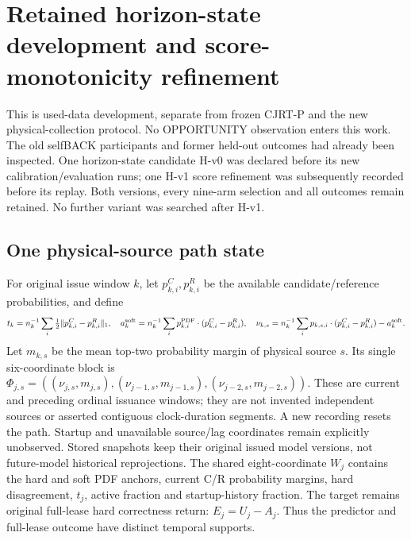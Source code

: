 \section{Retained horizon-state development and score-monotonicity refinement}
\label{app:horizon-development}
This is used-data development, separate from frozen CJRT-P and the new
physical-collection protocol. No OPPORTUNITY observation enters this work.
The old selfBACK participants and former held-out outcomes had already been
inspected. One horizon-state candidate H-v0 was declared before its new
calibration/evaluation runs; one H-v1 score refinement was subsequently
recorded before its replay. Both versions, every nine-arm selection and all
outcomes remain retained. No further variant was searched after H-v1.

\subsection{One physical-source path state}
For original issue window $k$, let $p^C_{k,i},p^R_{k,i}$ be the available
candidate/reference probabilities, and define
\begin{equation}
 t_k=n_k^{-1}\sum_i\tfrac12\|p^C_{k,i}-p^R_{k,i}\|_1,\quad
 a_k^{\rm soft}=n_k^{-1}\sum_i p^{\rm PDF}_{k,i}\cdot(p^C_{k,i}-p^R_{k,i}),\quad
 \nu_{k,s}=n_k^{-1}\sum_i p_{k,s,i}\cdot(p^C_{k,i}-p^R_{k,i})-a_k^{\rm soft}.
 \label{eq:h-development-soft-evidence}
\end{equation}
Let $m_{k,s}$ be the mean top-two probability margin of physical source $s$.
Its single six-coordinate block is
$\Phi_{j,s}=((\nu_{j,s},m_{j,s}),
(\nu_{j-1,s},m_{j-1,s}),(\nu_{j-2,s},m_{j-2,s}))$.
These are current and preceding ordinal issuance windows; they are not
invented independent sources or asserted contiguous clock-duration segments.
A new recording resets the path. Startup and unavailable source/lag
coordinates remain explicitly unobserved. Stored snapshots keep their
original issued model versions, not future-model historical reprojections.
The shared eight-coordinate $W_j$ contains the hard and soft PDF anchors,
current C/R probability margins, hard disagreement, $t_j$, active fraction
and startup-history fraction. The target remains original full-lease hard
correctness return: $E_j=U_j-A_j$. Thus the predictor and full-lease outcome
have distinct temporal supports.

